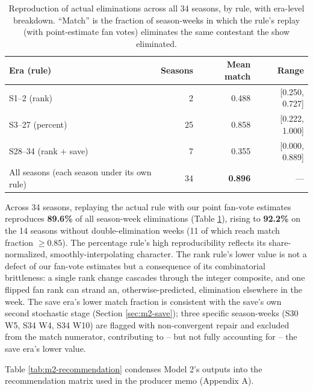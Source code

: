 \documentclass{article}
\begin{document}
\begin{table}[H]
\centering
\caption{Reproduction of actual eliminations across all 34 seasons, by rule, with era-level breakdown. ``Match'' is the fraction of season-weeks in which the rule's replay (with point-estimate fan votes) eliminates the same contestant the show eliminated.}
\label{tab:m2-match}
\begin{tabular}{lrrr}
\toprule
Era (rule) & Seasons & Mean match & Range \\
\midrule
S1--2 (rank) & 2 & 0.488 & [0.250, 0.727] \\
S3--27 (percent) & 25 & 0.858 & [0.222, 1.000] \\
S28--34 (rank + save) & 7 & 0.355 & [0.000, 0.889] \\
\midrule
All seasons (each season under its own rule) & 34 & \textbf{0.896} & --- \\
\bottomrule
\end{tabular}
\end{table}

Across 34 seasons, replaying the actual rule with our point fan-vote estimates reproduces \textbf{89.6\%} of all season-week eliminations (Table \ref{tab:m2-match}), rising to \textbf{92.2\%} on the 14 seasons without double-elimination weeks (11 of which reach match fraction $\ge 0.85$). The percentage rule's high reproducibility reflects its share-normalized, smoothly-interpolating character. The rank rule's lower value is not a defect of our fan-vote estimates but a consequence of its combinatorial brittleness: a single rank change cascades through the integer composite, and one flipped fan rank can strand an, otherwise-predicted, elimination elsewhere in the week. The save era's lower match fraction is consistent with the save's own second stochastic stage (Section \ref{sec:m2-save}); three specific season-weeks (S30 W5, S34 W4, S34 W10) are flagged with non-convergent repair and excluded from the match numerator, contributing to -- but not fully accounting for -- the save era's lower value.

Table \ref{tab:m2-recommendation} condenses Model 2's outputs into the recommendation matrix used in the producer memo (Appendix A).
\end{document}
